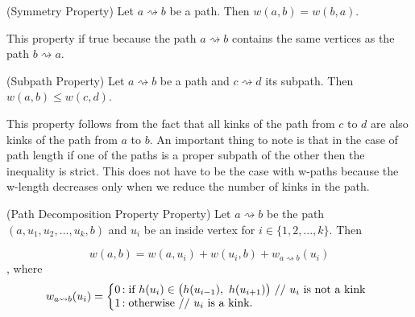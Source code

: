 



\begin{defn} (Symmetry Property) Let $a \rightsquigarrow b$ be a path. Then $w(a, b) = w(b, a)$. \end{defn}

This property if true because the path $a \rightsquigarrow b$ contains the same vertices as the path $b \rightsquigarrow a$.

\begin{defn} (Subpath Property) Let $a \rightsquigarrow b$ be a path and $c \rightsquigarrow d$ its subpath. Then $w(a, b) \le w(c, d)$. \end{defn}

This property follows from the fact that all kinks of the path from $c$ to $d$ are also kinks of the path from $a$ to $b$. An important thing to note is that in the case of path length if one of the paths is a proper subpath of the other then the inequality is strict. This does not have to be the case with w-paths because the w-length decreases only when we reduce the number of kinks in the path.

\begin{defn} (Path Decomposition Property Property) Let $a \rightsquigarrow b$ be the path $(a, u_1, u_2, ..., u_k, b)$ and $u_i$ be an inside vertex for $i \in \{1, 2, ..., k\}$. Then \end{defn}

$$w(a, b) = w(a, u_i) + w(u_i, b) + w_{a \rightsquigarrow b}(u_i)$$
, where
$$
w_{a \rightsquigarrow b}(u_i) = \left\{
   \begin{array}{@{}l@{\thinspace}l}
       \text{0}  &: \text{if } h(u_i) \in \big(h(u_{i-1}),~h(u_{i+1}) \big) \text{ // $u_i$ is not a kink} \\
       \text{1} &: \text{otherwise // $u_i$ is a kink.} \\
   \end{array}
\right.
$$

